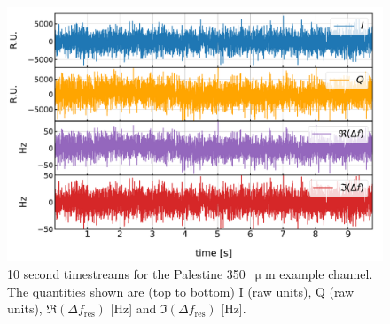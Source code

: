 \begin{figure}[!htbp]
\centering
\includegraphics[width=\textwidth]{figures/blast_data/timestreams/350_pal_ts_and_df_448}
\caption[~10 second timestreams for the Palestine 350~ example channel.]{10 second timestreams for the Palestine 350~$\upmu$m example channel. The quantities shown are (top to bottom) I (raw units), Q (raw units), $\Re(\Delta f_{\mathrm{res}})$ [Hz] and $\Im(\Delta f_{\mathrm{res}})$ [Hz].}
\label{fig:timestreams}
\end{figure}


